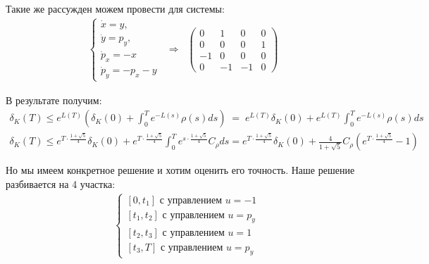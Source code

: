 \documentclass[a4paper,12pt]{article}
\begin{document}
Такие же рассужден можем провести для системы:
\begin{align*}
    \left\{
    \begin{array}{l}
        \dot x =y,\\
        \dot y= p_y,\\
        \dot p_x= -x\\
        \dot p_y= -p_x -y
    \end{array}
    \right.
    \;\;\Rightarrow\;\;
    \left(
    \begin{array}{cccc}
        0&1&0&0\\
        0&0&0&1\\
        -1&0&0&0\\
        0&-1&-1&0
    \end{array}
    \right)
\end{align*}

В результате получим:
\begin{align*}
    \delta_K(T) \leqslant e^{L(T)}\left(\delta_K(0)+\int_0^Te^{-L(s)}\rho(s)ds\right) \;=\; e^{L(T)}\delta_K(0)+e^{L(T)}\int_0^Te^{-L(s)}\rho(s)ds
    \\
    \delta_K(T) \leqslant e^{T\cdot\frac{1+\sqrt{5}}{4}}\delta_K(0)+e^{T\cdot\frac{1+\sqrt{5}}{4}}\int_0^Te^{s\cdot\frac{1+\sqrt{5}}{4}}C_{\rho}ds=e^{T\cdot\frac{1+\sqrt{5}}{4}}\delta_K(0)+\frac{4}{1+\sqrt{5}} C_{\rho} \left(e^{T\cdot\frac{1+\sqrt{5}}{4}}-1\right)
\end{align*}

Но мы имеем конкретное решение и хотим оценить его точность. Наше решение разбивается на 4 участка:
\begin{align*}
    &\left\{
    \begin{array}{l}
        \left[0,t_1\right] \text{ с управлением } u=-1\\
        \left[t_1,t_2\right] \text{ с управлением } u=p_y\\
        \left[t_2,t_3\right] \text{ с управлением } u=1\\
        \left[t_3,T\right] \text{ с управлением } u=p_y
    \end{array}
    \right.
\end{align*}
\end{document}
